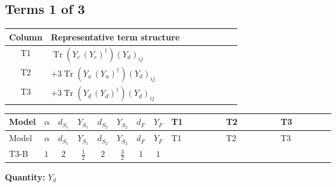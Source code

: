 \documentclass[8pt]{article}
\begin{document}
\begin{landscape}
\subsection*{Terms 1 of 3}
\begin{center}
\begin{tabular}{@{}c >{\raggedright\arraybackslash}p{0.82\linewidth}@{}}
\toprule
Column & Representative term structure \\
\midrule
T1 & \(\displaystyle \operatorname{Tr}\!\left({Y_e}\,\left({Y_e}\right)^{\dagger}\right) \left({Y_d}\right)_{ij}\) \\
\midrule
T2 & \(\displaystyle +3 \operatorname{Tr}\!\left({Y_u}\,\left({Y_u}\right)^{\dagger}\right) \left({Y_d}\right)_{ij}\) \\
\midrule
T3 & \(\displaystyle +3 \operatorname{Tr}\!\left({Y_d}\,\left({Y_d}\right)^{\dagger}\right) \left({Y_d}\right)_{ij}\) \\
\midrule
\bottomrule
\end{tabular}
\end{center}
\smallskip
\tiny
\begin{longtable}{@{}llcccccc >{\raggedright\arraybackslash}p{0.21\linewidth} >{\raggedright\arraybackslash}p{0.21\linewidth} >{\raggedright\arraybackslash}p{0.21\linewidth}@{}}
\toprule
Model & $\alpha$ & $d_{S_1}$ & $Y_{S_1}$ & $d_{S_2}$ & $Y_{S_2}$ & $d_F$ & $Y_F$ & T1 & T2 & T3 \\
\midrule
\endfirsthead
\toprule
Model & $\alpha$ & $d_{S_1}$ & $Y_{S_1}$ & $d_{S_2}$ & $Y_{S_2}$ & $d_F$ & $Y_F$ & T1 & T2 & T3 \\
\midrule
\endhead
T3-B & $1$ & $2$ & $\frac{1}{2}$ & $2$ & $\frac{3}{2}$ & $1$ & $1$ & \scriptsize\adjustbox{max width=\linewidth}{$\begin{gathered} \operatorname{Tr}\!\left({Y_e}\,\left({Y_e}\right)^{\dagger}\right) \left({Y_d}\right)_{ij}\end{gathered}$} & \scriptsize\adjustbox{max width=\linewidth}{$\begin{gathered} +3 \operatorname{Tr}\!\left({Y_u}\,\left({Y_u}\right)^{\dagger}\right) \left({Y_d}\right)_{ij}\end{gathered}$} & \scriptsize\adjustbox{max width=\linewidth}{$\begin{gathered} +3 \operatorname{Tr}\!\left({Y_d}\,\left({Y_d}\right)^{\dagger}\right) \left({Y_d}\right)_{ij}\end{gathered}$} \\
\midrule
\bottomrule
\end{longtable}
\clearpage
\noindent\textbf{Quantity: }$Y_d$\par\smallskip

\end{landscape}
\end{document}
